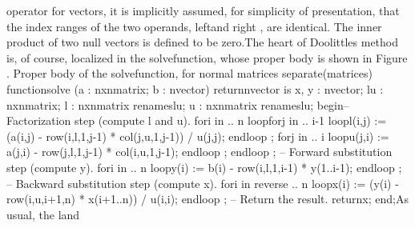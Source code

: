 operator for vectors, it is implicitly assumed, for simplicity of
presentation, that the index ranges of the two operands, %
\tyxffmxmono[]left\tyxffmxendmono[] and \tyxffmxmono[]right%
\tyxffmxendmono[], are identical. The inner product of two null vectors
is defined to be zero.\Endpara[]
\Para[]The heart of Doolittle\rsquo[]s method is, of course, localized
in the \tyxffmxmono[]solve\tyxffmxendmono[] function, whose proper
body is shown in Figure .
\Parbox[]
Proper body of the %
\tyxffmxmono[]solve\tyxffmxendmono[] function, for normal matrices%
\FgEndcap[]
\Comp[]\tyxtstxbf[]separate\tyxtstxendbf[] (matrices)
\tyxtstxbf[]function\tyxtstxendbf[] solve (a : nxn\Symuns[]matrix; b : n\Symuns[]vector) %
\tyxtstxbf[]return\tyxtstxendbf[] n\Symuns[]vector \tyxtstxbf[]is%
\tyxtstxendbf[]
   x, y : n\Symuns[]vector;
   lu   : nxn\Symuns[]matrix;
   l    : nxn\Symuns[]matrix \tyxtstxbf[]renames\tyxtstxendbf[] lu;
   u    : nxn\Symuns[]matrix \tyxtstxbf[]renames\tyxtstxendbf[] lu;
\tyxtstxbf[]begin\tyxtstxendbf[]
   -- Factorization step (compute l and u).
   \tyxtstxbf[]for\tyxtstxendbf[] i \tyxtstxbf[]in%
 .. n \tyxtstxbf[]loop\tyxtstxendbf[]
      \tyxtstxbf[]for\tyxtstxendbf[] j \tyxtstxbf[]in%
 .. i-1 \tyxtstxbf[]loop\tyxtstxendbf[]
         l(i,j) :=
            (a(i,j) - row(i,l,1,j-1) * col(j,u,1,j-1)) / u(j,j);
      \tyxtstxbf[]end\tyxtstxendbf[] \tyxtstxbf[]loop%
\tyxtstxendbf[];
      \tyxtstxbf[]for\tyxtstxendbf[] j \tyxtstxbf[]in%
 .. i \tyxtstxbf[]loop\tyxtstxendbf[]
         u(j,i) := a(j,i) - row(j,l,1,j-1) * col(i,u,1,j-1);
      \tyxtstxbf[]end\tyxtstxendbf[] \tyxtstxbf[]loop%
\tyxtstxendbf[];
   \tyxtstxbf[]end\tyxtstxendbf[] \tyxtstxbf[]loop%
\tyxtstxendbf[];
   -- Forward substitution step (compute y).
   \tyxtstxbf[]for\tyxtstxendbf[] i \tyxtstxbf[]in%
 .. n \tyxtstxbf[]loop\tyxtstxendbf[]
      y(i) := b(i) - row(i,l,1,i-1) * y(1..i-1);
   \tyxtstxbf[]end\tyxtstxendbf[] \tyxtstxbf[]loop%
\tyxtstxendbf[];
   -- Backward substitution step (compute x).
   \tyxtstxbf[]for\tyxtstxendbf[] i \tyxtstxbf[]in%
\tyxtstxendbf[] \tyxtstxbf[]reverse .. n %
\tyxtstxbf[]loop\tyxtstxendbf[]
      x(i) := (y(i) - row(i,u,i+1,n) * x(i+1..n)) / u(i,i);
   \tyxtstxbf[]end\tyxtstxendbf[] \tyxtstxbf[]loop%
\tyxtstxendbf[];
   -- Return the result.
   \tyxtstxbf[]return\tyxtstxendbf[] x;
\tyxtstxbf[]end\tyxtstxendbf[];\Endcomp[]
\EndParbox[]
\FgEndblock[]
 As usual, the \tyxffmxmono[]l\tyxffmxendmono[] and %
